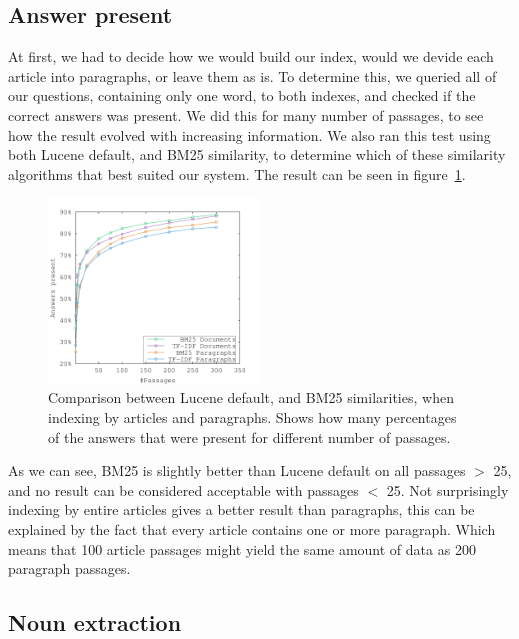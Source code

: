 \subsection{Answer present}
At first, we had to decide how we would build our index, would we devide each article into paragraphs, or leave them as is. 
To determine this, we queried all of our questions, containing only one word, to both indexes, and checked if the correct answers was present.
We did this for many number of passages, to see how the result evolved with increasing information.
We also ran this test using both Lucene default, and BM25 similarity, to determine which of these similarity algorithms that best suited our system.
The result can be seen in figure~\ref{fig:bm25_tfdf}.

\begin{figure}[h!]
  \centering
  \includegraphics[width=0.5\textwidth]{figures/bm25_tfdf.pdf}
  \caption{Comparison between Lucene default, and BM25 similarities, when indexing by articles and paragraphs. 
  Shows how many percentages of the answers that were present for different number of passages.}
  \label{fig:bm25_tfdf}
\end{figure}

As we can see, BM25 is slightly better than Lucene default on all passages $>$ 25, and no result can be considered acceptable with passages $<$ 25.
Not surprisingly indexing by entire articles gives a better result than paragraphs, 
this can be explained by the fact that every article contains one or more paragraph. 
Which means that 100 article passages might yield the same amount of data as 200 paragraph passages.

\subsection{Noun extraction}


